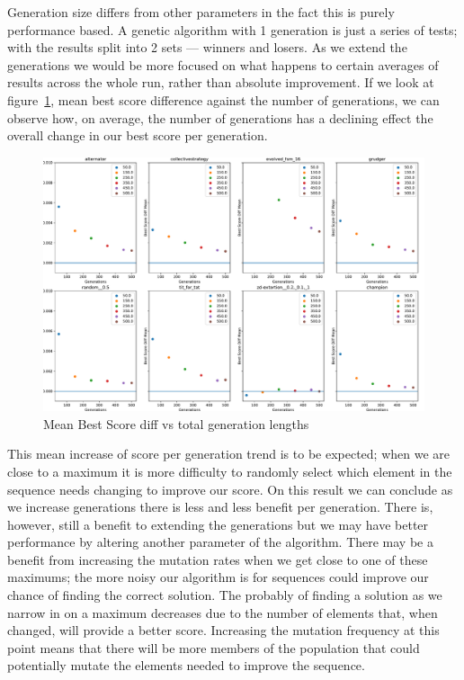 Generation size differs from other parameters in the fact this is purely performance based.
A genetic algorithm with 1 generation is just a series of tests;
with the results split into 2 sets --- winners and losers.
As we extend the generations we would be more focused on what happens to certain averages of results across the whole run, rather than absolute improvement.
If we look at figure~\ref{fig:GENS-mean-bs-diff-v-gens-all}, mean best score difference against the number of generations, we can observe how, on average, the number of generations has a declining effect the overall change in our best score per generation.

\begin{figure}[ht]
    \includegraphics[width=1.0\textwidth, center]{./img/plots/GENS_mean_bs_diff_v_gens_all.pdf}
    \caption{Mean Best Score diff vs total generation lengths}\label{fig:GENS-mean-bs-diff-v-gens-all}
\end{figure}

This mean increase of score per generation trend is to be expected;
when we are close to a maximum it is more difficulty to randomly select which element in the sequence needs changing to improve our score.
On this result we can conclude as we increase generations there is less and less benefit per generation.
There is, however, still a benefit to extending the generations but we may have better performance by altering another parameter of the algorithm.
There may be a benefit from increasing the mutation rates when we get close to one of these maximums;
the more noisy our algorithm is for sequences could improve our chance of finding the correct solution.
The probably of finding a solution as we narrow in on a maximum decreases due to the number of elements that, when changed, will provide a better score.
Increasing the mutation frequency at this point means that there will be more members of the population that could potentially mutate the elements needed to improve the sequence.

